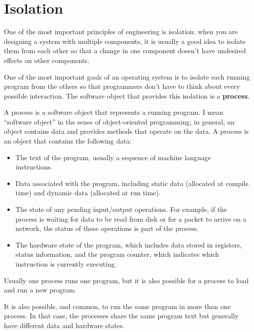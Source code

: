 \documentclass[12pt]{book}
\begin{document}
{\section{Isolation}

One of the most important principles of engineering is isolation:
when you are designing a system with multiple components, it is usually
a good idea to isolate them from each other so that a change in one
component doesn't have undesired effects on other components.

One of the most important goals of an operating system is to isolate
each running program from the others so that programmers don't have to
think about every possible interaction.  The software object that
provides this isolation is a {\bf process}.

A process is a software object that represents a running program.
I mean ``software object'' in the sense of object-oriented programming;
in general, an object contains data and provides methods
that operate on the data.  A process is an object that contains the
following data:

\begin{itemize}

\item The text of the program, usually a sequence of
  machine language instructions.

\item Data associated with the program, including static data (allocated
  at compile time) and dynamic data (allocated at run time).

\item The state of any pending input/output operations.  For example,
  if the process is waiting for data to be read from disk or for a
  packet to arrive on a network, the status of these operations is
  part of the process.

\item The hardware state of the program, which includes data stored
  in registers, status information, and the program counter, which
  indicates which instruction is currently executing.

\end{itemize}

Usually one process runs one program, but it is also possible for
a process to load and run a new program.

It is also possible, and common, to run the same program in more than one
process.  In that case, the processes share the same program text
but generally have different data and hardware states.

}
\end{document}
